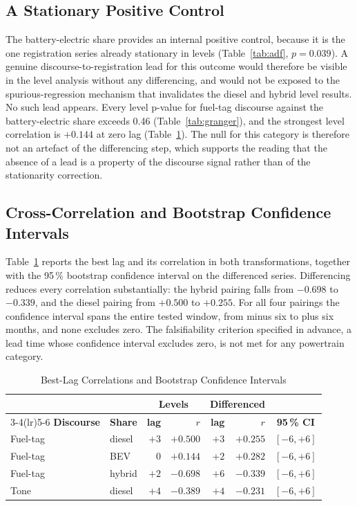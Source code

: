 \documentclass[conference]{IEEEtran}
\begin{document}
\subsection{A Stationary Positive Control}
The battery-electric share provides an internal positive control, because it is
the one registration series already stationary in levels (Table~\ref{tab:adf},
$p=0.039$). A genuine discourse-to-registration lead for this outcome would
therefore be visible in the level analysis without any differencing, and would
not be exposed to the spurious-regression mechanism that invalidates the diesel
and hybrid level results. No such lead appears. Every level p-value for fuel-tag
discourse against the battery-electric share exceeds 0.46
(Table~\ref{tab:granger}), and the strongest level correlation is $+0.144$ at
zero lag (Table~\ref{tab:boot}). The null for this category is therefore not an
artefact of the differencing step, which supports the reading that the absence of
a lead is a property of the discourse signal rather than of the stationarity
correction.

\subsection{Cross-Correlation and Bootstrap Confidence Intervals}
Table~\ref{tab:boot} reports the best lag and its correlation in both
transformations, together with the 95\,\% bootstrap confidence interval on the
differenced series. Differencing reduces every correlation substantially: the
hybrid pairing falls from $-0.698$ to $-0.339$, and the diesel pairing from
$+0.500$ to $+0.255$. For all four pairings the confidence interval spans the
entire tested window, from minus six to plus six months, and none excludes zero.
The falsifiability criterion specified in advance, a lead time whose confidence
interval excludes zero, is not met for any powertrain category.

\begin{table}[t]
\caption{Best-Lag Correlations and Bootstrap Confidence Intervals}
\label{tab:boot}
\centering \small
\setlength{\tabcolsep}{3.5pt}
\begin{tabular}{@{}llrrrrc@{}}
\toprule
& & \multicolumn{2}{c}{\textbf{Levels}} &
\multicolumn{2}{c}{\textbf{Differenced}} & \\
\cmidrule(lr){3-4}\cmidrule(lr){5-6}
\textbf{Discourse} & \textbf{Share} & \textbf{lag} & \textbf{$r$} &
\textbf{lag} & \textbf{$r$} & \textbf{95\,\% CI} \\ \midrule
Fuel-tag & diesel & $+3$ & $+0.500$ & $+3$ & $+0.255$ & $[-6,+6]$ \\
Fuel-tag & BEV    & $0$  & $+0.144$ & $+2$ & $+0.282$ & $[-6,+6]$ \\
Fuel-tag & hybrid & $+2$ & $-0.698$ & $+6$ & $-0.339$ & $[-6,+6]$ \\
Tone     & diesel & $+4$ & $-0.389$ & $+4$ & $-0.231$ & $[-6,+6]$ \\
\bottomrule
\end{tabular}
\end{table}
\end{document}

